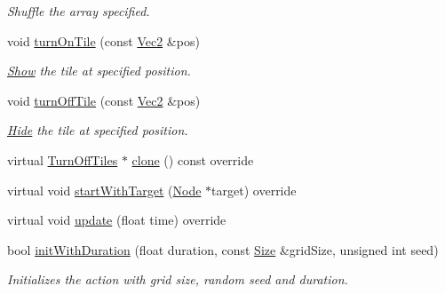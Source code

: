 \begin{DoxyCompactItemize}
\begin{DoxyCompactList}\small\item\em Shuffle the array specified. \end{DoxyCompactList}\item 
void \hyperlink{classTurnOffTiles_a163856e08a10c7c6f5432c29d560f797}{turn\+On\+Tile} (const \hyperlink{classVec2}{Vec2} \&pos)
\begin{DoxyCompactList}\small\item\em \hyperlink{classShow}{Show} the tile at specified position. \end{DoxyCompactList}\item 
void \hyperlink{classTurnOffTiles_acf0d94735c46519fe4b301accd43a715}{turn\+Off\+Tile} (const \hyperlink{classVec2}{Vec2} \&pos)
\begin{DoxyCompactList}\small\item\em \hyperlink{classHide}{Hide} the tile at specified position. \end{DoxyCompactList}\item 
virtual \hyperlink{classTurnOffTiles}{Turn\+Off\+Tiles} $\ast$ \hyperlink{classTurnOffTiles_a270bb6ccc1a650fffa8c9165b4aba69a}{clone} () const override
\item 
virtual void \hyperlink{classTurnOffTiles_adb571aa2b12a065bb9cd94fe2c1f9eb0}{start\+With\+Target} (\hyperlink{classNode}{Node} $\ast$target) override
\item 
virtual void \hyperlink{classTurnOffTiles_a138edd4a33ea3e211cf2f5aa495c4138}{update} (float time) override
\item 
bool \hyperlink{classTurnOffTiles_a93d4217046be61a119760b1870840926}{init\+With\+Duration} (float duration, const \hyperlink{classSize}{Size} \&grid\+Size, unsigned int seed)
\begin{DoxyCompactList}\small\item\em Initializes the action with grid size, random seed and duration. \end{DoxyCompactList}\end{DoxyCompactItemize}

